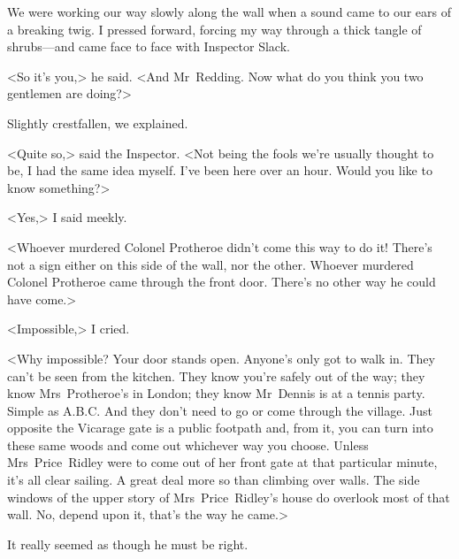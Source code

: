 We were working our way slowly along the wall when a sound came to our ears of a breaking twig. I pressed forward, forcing my way through a thick tangle of shrubs—and came face to face with Inspector Slack.

<So it's you,> he said. <And Mr~Redding. Now what do you think you two gentlemen are doing?>

Slightly crestfallen, we explained.

<Quite so,> said the Inspector. <Not being the fools we're usually thought to be, I had the same idea myself. I've been here over an hour. Would you like to know something?>

<Yes,> I said meekly.

<Whoever murdered Colonel Protheroe didn't come this way to do it! There's not a sign either on this side of the wall, nor the other. Whoever murdered Colonel Protheroe came through the front door. There's no other way he could have come.>

<Impossible,> I cried.

\begin{a4}
	\enlargethispage{-\baselineskip}
\end{a4}

<Why impossible? Your door stands open. Anyone's only got to walk in. They can't be seen from the kitchen. They know you're safely out of the way; they know Mrs~Protheroe's in London; they know Mr~Dennis is at a tennis party. Simple as A.B.C. And they don't need to go or come through the village. Just opposite the Vicarage gate is a public footpath and, from it, you can turn into these same woods and come out whichever way you choose. Unless Mrs~Price~Ridley were to come out of her front gate at that particular minute, it's all clear sailing. A great deal more so than climbing over walls. The side windows of the upper story of Mrs~Price~Ridley's house do overlook most of that wall. No, depend upon it, that's the way he came.>

It really seemed as though he must be right.